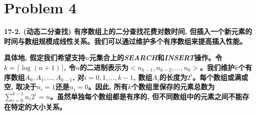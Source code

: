 \documentclass[paper=a4, fontsize=11pt]{scrartcl} %
\numberwithin{equation}{section} %
\numberwithin{figure}{section} %
\numberwithin{table}{section} %
\begin{document}
\section{Problem 4}
\textbf{17-2. (动态二分查找) 有序数组上的二分查找花费对数时间, 但插入一个新元素的时间与数组规模成线性关系。我们可以通过维护多个有序数组来提高插入性能。}

\hspace{2em}\textbf{具体地, 假定我们希望支持$n$元集合上的\textit{SEARCH}和\textit{INSERT}操作。令$k = \lceil \log(n+1) \rceil$, 令$n$的二进制表示为$<n_{k-1}, n_{k-2}, \dots, n_0>$。我们维护$k$个有序数组$A_0, A_1, \dots, A_{k-1}$, 对$i = 0, 1, \dots, k-1$, 数组$A_i$的长度为$2^i$。每个数组或满或空, 取决于$n_i = 1$还是$n_i = 0$。因此, 所有$k$个数组里保存的元素总数为$\sum_{i=0}^{k-1} {n_i2^i} = n$。虽然单独每个数组都是有序的, 但不同数组中的元素之间不能存在特定的大小关系。}
\end{document}
